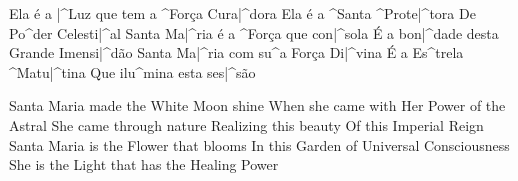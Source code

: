  \beginchorus{}
    Ela é a |^Luz que tem a ^Força Cura|^dora
    Ela é a ^Santa ^Prote|^tora
    De Po^der Celesti|^al
  \endchorus
  \beginverse{}
    Santa Ma|^ria é a ^Força que con|^sola
    É a bon|^dade desta Grande Imensi|^dão
  \endverse
  \beginchorus{}
    Santa Ma|^ria com su^a Força Di|^vina
    É a Es^trela ^Matu|^tina
    Que ilu^mina esta ses|^são
  \endchorus
  \begin{translation}
    Santa Maria made the White Moon shine
    When she came with Her Power of the Astral
    \nextverse
    She came through nature
    Realizing this beauty
    Of this Imperial Reign
    \nextverse
    Santa Maria is the Flower that blooms
    In this Garden of Universal Consciousness
    \nextverse
    She is the Light that has the Healing Power

\end{translation}\]\]\]\]\]\]\]\]\]\]\]\]\]\]\]\]\]\]\]\]\]\]\]\]\]\]\]\]\]\]\]\]\]\]\]\]\]\]\]\]\]\]\]\]\]\]\]\]\]\]\]\]\]\]\]\]\]\]\]\]\]\]\]\]\]\]\]\]\]\]\]\]\]\]\]\]\]\]\]\]\]\]\]\]\]\]\]\]\]\]\]\]\]\]\]\]\]\]\]\]\]\]\]\]\]\]\]\]\]\]\]\]\]\]\]\]\]\]\]\]\]\]\]\]\]\]\]\]\]\]\]\]\]\]\]\]\]\]\]\]\]\]\]\]\]\]\]\]\]\]\]\]\]\]\]\]\]\]\]\]\]\]\]\]\]\]\]\]\]\]\]\]\]\]\]\]\]\]\]\]\]\]\]\]\]\]\]\]\]\]\]\]\]\]\]\]\]\]\]\]\]\]\]\]\]\]\]\]\]\]\]\]\]\]\]\]\]\]\]\]\]\]\]\]\]\]\]\]\]\]\]\]\]\]\]\]\]\]\]\]\]\]\]\]\]\]\]\]\]\]\]\]\]\]\]\]\]\]\]\]\]\]\]\]\]\]\]\]\]\]\]\]\]\]\]\]\]\]\]\]\]\]\]\]\]\]\]\]\]\]\]\]\]\]\]\]\]\]\]\]\]\]\]\]\]\]\]\]\]\]\]\]\]\]\]\]\]\]\]\]\]\]\]\]\]\]\]\]\]\]\]\]\]\]\]\]\]\]\]\]\]\]\]\]\]\]\]\]\]\]\]\]\]\]\]\]\]\]\]\]\]\]\]\]\]\]\]\]\]\]\]\]\]\]\]\]\]\]\]\]\]\]\]\]\]\]\]\]\]\]\]\]\]\]\]\]\]\]\]\]\]\]\]\]\]\]\]\]\]\]\]\]\]\]\]\]\]\]\]\]\]\]\]\]\]\]\]\]\]\]\]\]\]\]\]\]\]\]\]\]\]\]\]\]\]\]\]\]\]\]\]\]\]\]\]\]\]\]\]\]\]\]\]\]\]\]\]\]\]\]\]\]\]\]\]\]\]\]\]\]\]\]\]\]\]\]\]\]\]\]\]\]\]\]\]\]\]\]\]\]\]\]\]\]\]\]\]\]\]\]\]\]\]\]\]\]\]\]\]\]\]\]\]\]\]\]\]\]\]\]\]\]\]\]\]\]\]\]\]\]\]\]\]\]\]\]\]\]\]\]\]\]\]\]\]\]\]\]\]\]\]\]\]\]\]\]\]\]\]\]\]\]\]\]\]\]\]\]\]\]\]\]\]\]\]\]\]\]\]\]\]\]\]\]\]\]\]\]\]\]\]\]\]\]\]\]\]\]\]\]\]\]\]\]\]\]\]\]\]\]\]\]\]\]\]\]\]\]\]\]\]\]\]\]\]\]\]\]\]\]\]\]\]\]\]\]\]\]\]\]\]\]\]\]\]\]\]\]\]\]\]\]\]\]\]\]\]\]\]\]\]\]\]\]\]\]\]\]\]\]\]\]\]\]\]\]\]\]\]\]\]\]\]\]\]\]\]\]\]\]\]\]\]\]\]\]\]\]\]\]\]\]\]\]\]\]\]\]\]\]\]\]\]\]\]\]\]\]\]\]\]\]\]\]\]\]\]\]\]\]\]\]\]\]\]\]\]\]\]\]\]\]\]\]\]\]\]\]\]\]\]\]\]\]\]\]\]\]\]\]\]\]\]\]\]\]\]\]\]\]\]\]\]\]\]\]\]\]\]\]\]\]\]\]\]\]\]\]\]\]\]\]\]\]\]\]\]\]\]\]\]\]\]\]\]\]\]\]\]\]\]\]\]\]\]\]\]\]\]\]\]\]\]\]\]\]\]\]\]\]\]\]\]\]\]\]\]\]\]\]\]\]\]\]\]\]\]\]\]\]\]\]\]\]\]\]\]\]\]\]\]\]\]\]\]\]\]\]\]\]\]\]\]\]\]\]\]\]\]\]\]\]\]\]\]\]\]\]\]\]\]\]\]\]\]\]\]\]\]\]\]\]\]\]\]\]\]\]\]\]\]\]\]\]\]\]\]\]\]\]\]\]\]\]\]\]\]\]\]\]\]\]\]\]\]\]\]\]\]\]\]\]\]\]\]\]\]\]\]\]\]\]\]\]\]\]\]\]\]\]\]\]\]\]\]\]\]\]\]\]\]\]\]\]\]\]\]\]\]\]\]\]\]\]\]\]\]\]\]\]\]\]\]\]\]\]\]\]\]\]\]\]\]\]\]\]\]\]\]\]\]\]\]\]\]\]\]\]\]\]\]\]\]\]\]\]\]\]\]\]\]\]\]\]\]\]\]\]\]\]\]\]\]\]\]\]\]\]\]\]\]\]\]\]\]\]\]\]\]\]\]\]\]\]\]\]\]\]\]\]\]\]\]\]\]\]\]\]\]\]\]\]\]\]\]\]\]\]\]\]\]\]\]\]\]\]\]\]\]\]\]\]\]\]\]\]\]\]\]\]\]\]\]\]\]\]\]\]\]\]\]\]\]\]\]\]\]\]\]\]\]\]\]\]\]\]\]\]\]\]\]\]\]\]\]\]\]\]\]\]\]\]\]\]\]\]\]\]\]\]\]\]\]\]\]\]\]\]\]\]\]\]\]\]\]\]\]\]\]\]\]\]\]\]\]\]\]\]\]\]\]\]\]\]\]\]\]\]\]\]\]\]\]\]\]\]\]\]\]\]\]\]\]\]\]\]\]\]\]\]\]\]\]\]\]\]\]\]\]\]\]\]\]\]\]\]\]\]\]\]
